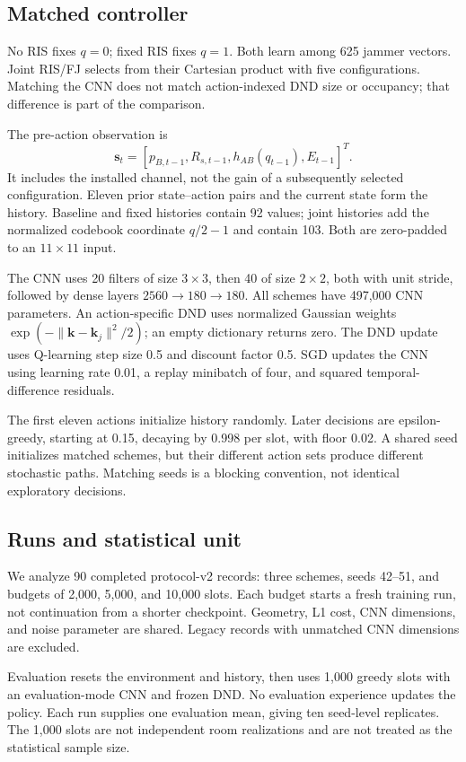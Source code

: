 \documentclass[journal,10pt,twocolumn]{IEEEtran}
\begin{document}
\subsection{Matched controller}
No RIS fixes $q=0$; fixed RIS fixes $q=1$. Both learn among 625 jammer vectors. Joint RIS/FJ selects from their Cartesian product with five configurations. Matching the CNN does not match action-indexed DND size or occupancy; that difference is part of the comparison.

The pre-action observation is
\begin{equation}
\mathbf s_t=[p_{B,t-1},R_{s,t-1},h_{AB}(q_{t-1}),E_{t-1}]^T.
\end{equation}
It includes the installed channel, not the gain of a subsequently selected configuration. Eleven prior state--action pairs and the current state form the history. Baseline and fixed histories contain 92 values; joint histories add the normalized codebook coordinate $q/2-1$ and contain 103. Both are zero-padded to an $11\times11$ input.

The CNN uses 20 filters of size $3\times3$, then 40 of size $2\times2$, both with unit stride, followed by dense layers $2560\to180\to180$. All schemes have 497,000 CNN parameters. An action-specific DND uses normalized Gaussian weights $\exp(-\|\mathbf k-\mathbf k_j\|^2/2)$; an empty dictionary returns zero. The DND update uses Q-learning step size 0.5 and discount factor 0.5. SGD updates the CNN using learning rate 0.01, a replay minibatch of four, and squared temporal-difference residuals.

The first eleven actions initialize history randomly. Later decisions are epsilon-greedy, starting at 0.15, decaying by 0.998 per slot, with floor 0.02. A shared seed initializes matched schemes, but their different action sets produce different stochastic paths. Matching seeds is a blocking convention, not identical exploratory decisions.

\subsection{Runs and statistical unit}
We analyze 90 completed protocol-v2 records: three schemes, seeds 42--51, and budgets of 2,000, 5,000, and 10,000 slots. Each budget starts a fresh training run, not continuation from a shorter checkpoint. Geometry, L1 cost, CNN dimensions, and noise parameter are shared. Legacy records with unmatched CNN dimensions are excluded.

Evaluation resets the environment and history, then uses 1,000 greedy slots with an evaluation-mode CNN and frozen DND. No evaluation experience updates the policy. Each run supplies one evaluation mean, giving ten seed-level replicates. The 1,000 slots are not independent room realizations and are not treated as the statistical sample size.
\end{document}
